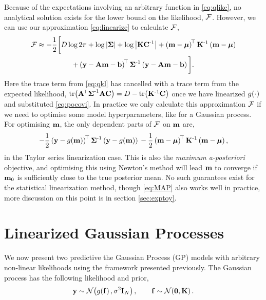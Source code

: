 \documentclass{article} %
\begin{document}
Because of the expectations involving an arbitrary function in
\eqref{eq:qlike}, no analytical solution exists for the lower bound on the
likelihood, $\mathcal{F}$. However, we can use our approximation
\eqref{eq:linearize} to calculate $\mathcal{F}$,
\begin{multline}
    \mathcal{F} \approx - \frac{1}{2} \bigg[
        D\log{2\pi} + \log\left|{\boldsymbol{\Sigma}}\right| + \log\left|{\mathbf{K}\mathbf{C}^{\text{-}1}}\right|
    + \left({\mathbf{m} - \boldsymbol{\mu}}\right)^{\!\top}\mathbf{K}^{\text{-}1}
        \left({\mathbf{m} - \boldsymbol{\mu}}\right) \\
    + \left({\mathbf{y} - \mathbf{A}\mathbf{m} - \mathbf{b}}\right)^{\!\top}\boldsymbol{\Sigma}^{\text{-}1}
        \left({\mathbf{y} - \mathbf{A}\mathbf{m} - \mathbf{b}}\right)
        \bigg].
    \label{eq:approxfengy}
\end{multline}
Here the trace term from \eqref{eq:qkl} has cancelled with a trace term from
the expected likelihood, $\text{tr}\!\left({\mathbf{A}^{\!\top}\boldsymbol{\Sigma}^{\text{-}1}\mathbf{A}\mathbf{C}}\right) = D -
\text{tr}\!\left({\mathbf{K}^{\text{-}1}\mathbf{C}}\right)$ once we have linearized $g\!\left({{\cdot}}\right)$ and
substituted \eqref{eq:pocovi}. In practice we only calculate this approximation
$\mathcal{F}$ if we need to optimise some model hyperparameters, like for a Gaussian
process. For optimising $\mathbf{m}$, the only dependent parts of $\mathcal{F}$ on
$\mathbf{m}$ are,
\begin{equation}
    -\frac{1}{2} \left({\mathbf{y} - g\!\left({{\mathbf{m}}}\right)}\right)^{\!\top}
            \boldsymbol{\Sigma}^{\text{-}1}
            \left({\mathbf{y} - g\!\left({{\mathbf{m}}}\right)}\right) \\
    -\frac{1}{2}
        \left({\mathbf{m} - \boldsymbol{\mu}}\right)^{\!\top}
        \mathbf{K}^{\text{-}1}
        \left({\mathbf{m} - \boldsymbol{\mu}}\right),
    \label{eq:MAP}
\end{equation}
in the Taylor series linearization case. This is also the \emph{maximum
    a-posteriori} objective, and optimising this using Newton's method will
lead $\mathbf{m}$ to converge if $\mathbf{m}_0$ is sufficiently close to the true
posterior mean. No such guarantees exist for the statistical linearization
method, though \eqref{eq:MAP} also works well in practice, more discussion on
this point is in section \ref{sec:exptoy}. 


\section{Linearized Gaussian Processes}
\label{sec:gpmod}

We now present two predictive the Gaussian Process (GP) models
\cite{Rasmussen2006} with arbitrary non-linear likelihoods using the framework
presented previously. The Gaussian process has the following likelihood and
prior,
\begin{equation}
    \mathbf{y} \sim \mathcal{N}\!\left({g\!\left({{\mathbf{f}}}\right), \sigma^2\mathbf{I}_{N}}\right), \qquad
    \mathbf{f} \sim \mathcal{N}\!\left({\mathbf{0}, \mathbf{K}}\right).
    \label{eq:gplikeprior}
\end{equation}
\end{document}
